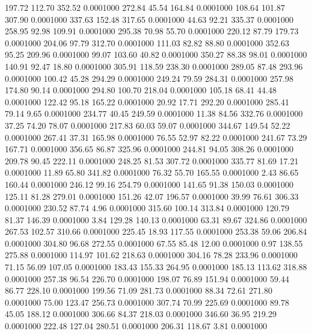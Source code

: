  197.72  112.70  352.52   0.0001000
 272.84   45.54  164.84   0.0001000
 108.64  101.87  307.90   0.0001000
 337.63  152.48  317.65   0.0001000
  44.63   92.21  335.37   0.0001000
 258.95   92.98  109.91   0.0001000
 295.38   70.98   55.70   0.0001000
 220.12   87.79  179.73   0.0001000
 204.06   97.79  312.70   0.0001000
 111.03   82.82   88.80   0.0001000
 352.63   95.25  209.96   0.0001000
  99.07  103.60   40.82   0.0001000
 350.27   88.38   98.01   0.0001000
 140.91   92.47   18.80   0.0001000
 305.91  118.59  238.30   0.0001000
 289.05   87.48  293.96   0.0001000
 100.42   45.28  294.29   0.0001000
 249.24   79.59  284.31   0.0001000
 257.98  174.80   90.14   0.0001000
 294.80  100.70  218.04   0.0001000
 105.18   68.41   44.48   0.0001000
 122.42   95.18  165.22   0.0001000
  20.92   17.71  292.20   0.0001000
 285.41   79.14    9.65   0.0001000
 234.77   40.45  249.59   0.0001000
  11.38   84.56  332.76   0.0001000
  37.25   74.20   78.07   0.0001000
 217.83   60.03   59.07   0.0001000
 344.67  149.54   52.22   0.0001000
 267.41   37.31  165.98   0.0001000
  76.55   52.97   82.22   0.0001000
 241.67   73.29  167.71   0.0001000
 356.65   86.87  325.96   0.0001000
 244.81   94.05  308.26   0.0001000
 209.78   90.45  222.11   0.0001000
 248.25   81.53  307.72   0.0001000
 335.77   81.69   17.21   0.0001000
  11.89   65.80  341.82   0.0001000
  76.32   55.70  165.55   0.0001000
   2.43   86.65  160.44   0.0001000
 246.12   99.16  254.79   0.0001000
 141.65   91.38  150.03   0.0001000
 125.11   81.28  279.01   0.0001000
 151.26   42.07  196.57   0.0001000
  39.99   76.61  306.33   0.0001000
 230.52   87.74    4.96   0.0001000
 315.60  100.14  313.84   0.0001000
 120.79   81.37  146.39   0.0001000
   3.84  129.28  140.13   0.0001000
  63.31   89.67  324.86   0.0001000
 267.53  102.57  310.66   0.0001000
 225.45   18.93  117.55   0.0001000
 253.38   59.06  206.84   0.0001000
 304.80   96.68  272.55   0.0001000
  67.55   85.48   12.00   0.0001000
   0.97  138.55  275.88   0.0001000
 114.97  101.62  218.63   0.0001000
 304.16   78.28  233.96   0.0001000
  71.15   56.09  107.05   0.0001000
 183.43  155.33  264.95   0.0001000
 185.13  113.62  318.88   0.0001000
 257.38   96.54  226.70   0.0001000
 198.07   76.89  151.94   0.0001000
  59.44   86.77  228.10   0.0001000
 199.56   71.09  281.73   0.0001000
  88.34   72.61  271.80   0.0001000
  75.00  123.47  256.73   0.0001000
 307.74   70.99  225.69   0.0001000
  89.78   45.05  188.12   0.0001000
 306.66   84.37  218.03   0.0001000
 346.60   36.95  219.29   0.0001000
 222.48  127.04  280.51   0.0001000
 206.31  118.67    3.81   0.0001000
